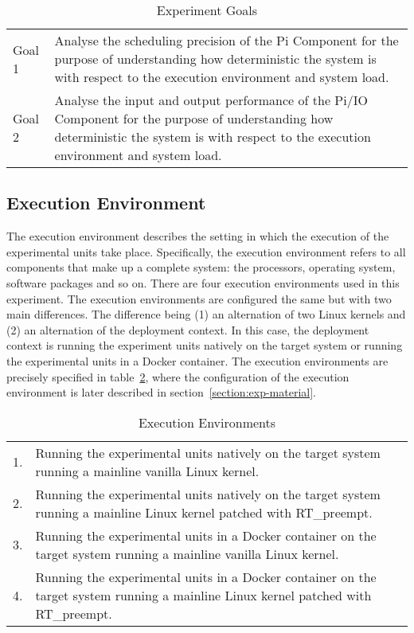 \begin{table}[ht]
\begin{tabular}{l|p{12cm}}
Goal 1 & Analyse the scheduling precision of the Pi Component for the purpose of understanding how deterministic the system is with respect to the execution environment and system load. \\
Goal 2 & Analyse the input and output performance of the Pi/IO Component for the purpose of understanding how deterministic the system is with respect to the execution environment and system load.
\end{tabular}
\centering
\caption{Experiment Goals}
\label{table:exp-goals}
\end{table}


\subsection{Execution Environment} \label{section:exe-env}
The execution environment describes the setting in which the execution of the experimental units take place. Specifically, the execution environment refers to all components that make up a complete system: the processors, operating system, software packages and so on. There are four execution environments used in this experiment. The execution environments are configured the same but with two main differences. The difference being (1) an alternation of two Linux kernels and (2) an alternation of the deployment context. In this case, the deployment context is running the experiment units natively on the target system or running the experimental units in a Docker container. The execution environments are precisely specified in table~\ref{table:exe-env}, where the configuration of the execution environment is later described in section~\ref{section:exp-material}.


\begin{table}[ht]
\begin{tabular}{l|p{14cm}}
1. & Running the experimental units natively on the target system running a mainline vanilla Linux kernel.                               \\
2. & Running the experimental units natively on the target system running a mainline Linux kernel patched with RT\_preempt.              \\
3. & Running the experimental units in a Docker container on the target system running a mainline vanilla Linux kernel.                  \\
4. & Running the experimental units in a Docker container on the target system running a mainline Linux kernel patched with RT\_preempt.
\end{tabular}
\centering
\caption{Execution Environments}
\label{table:exe-env}
\end{table}


